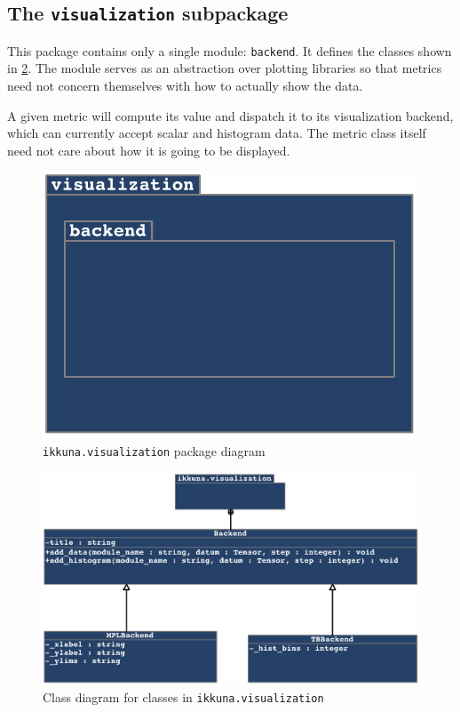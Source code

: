 \hypertarget{sec:pack-visualization}{%
\subsection{The \texttt{visualization} subpackage}\label{sec:pack-visualization}}

This package contains only a single module:
\texttt{backend}. It defines the classes shown in
\cref{fig:class-diag-backend}. The module serves as an abstraction over
plotting libraries so that metrics need not concern themselves with how
to actually show the data.

A given metric will compute its value and dispatch it to its
visualization backend, which can currently accept scalar and histogram
data. The metric class itself need not care about how it is going to be
displayed.

\begin{figure}
    \hypertarget{fig:pack-diag-visualization}{%
        \centering
        \includegraphics[max width=.5\textwidth]{gfx/diagrams/class_diagrams/visualization_package_diagram.pdf}
        \caption{\texttt{ikkuna.visualization} package diagram}\label{fig:pack-diag-visualization}
    }
\end{figure}

\begin{figure}
    \hypertarget{fig:class-diag-backend}{%
        \centering
        \includegraphics[max width=\textwidth]{gfx/diagrams/class_diagrams/visualization_class_diagram.pdf}
        \caption{Class diagram for classes in \texttt{ikkuna.visualization}}\label{fig:class-diag-backend}
    }
\end{figure}

